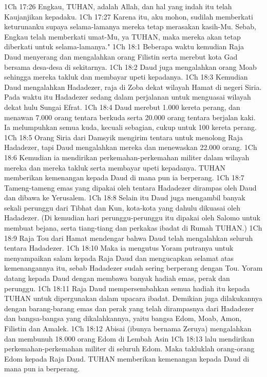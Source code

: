 1Ch 17:26  Engkau, TUHAN, adalah Allah, dan hal yang indah itu telah Kaujanjikan kepadaku.
1Ch 17:27  Karena itu, aku mohon, sudilah memberkati keturunanku supaya selama-lamanya mereka tetap merasakan kasih-Mu. Sebab, Engkau telah memberkati umat-Mu, ya TUHAN, maka mereka akan tetap diberkati untuk selama-lamanya."
1Ch 18:1  Beberapa waktu kemudian Raja Daud menyerang dan mengalahkan orang Filistin serta merebut kota Gad bersama desa-desa di sekitarnya.
1Ch 18:2  Daud juga mengalahkan orang Moab sehingga mereka takluk dan membayar upeti kepadanya.
1Ch 18:3  Kemudian Daud mengalahkan Hadadezer, raja di Zoba dekat wilayah Hamat di negeri Siria. Pada waktu itu Hadadezer sedang dalam perjalanan untuk menguasai wilayah dekat hulu Sungai Efrat.
1Ch 18:4  Daud merebut 1.000 kereta perang, dan menawan 7.000 orang tentara berkuda serta 20.000 orang tentara berjalan kaki. Ia melumpuhkan semua kuda, kecuali sebagian, cukup untuk 100 kereta perang.
1Ch 18:5  Orang Siria dari Damsyik mengirim tentara untuk menolong Raja Hadadezer, tapi Daud mengalahkan mereka dan menewaskan 22.000 orang.
1Ch 18:6  Kemudian ia mendirikan perkemahan-perkemahan militer dalam wilayah mereka dan mereka takluk serta membayar upeti kepadanya. TUHAN memberikan kemenangan kepada Daud di mana pun ia berperang.
1Ch 18:7  Tameng-tameng emas yang dipakai oleh tentara Hadadezer dirampas oleh Daud dan dibawa ke Yerusalem.
1Ch 18:8  Selain itu Daud juga mengambil banyak sekali perunggu dari Tibhat dan Kun, kota-kota yang dahulu dikuasai oleh Hadadezer. (Di kemudian hari perunggu-perunggu itu dipakai oleh Salomo untuk membuat bejana, serta tiang-tiang dan perkakas ibadat di Rumah TUHAN.)
1Ch 18:9  Raja Tou dari Hamat mendengar bahwa Daud telah mengalahkan seluruh tentara Hadadezer.
1Ch 18:10  Maka ia mengutus Yoram putranya untuk menyampaikan salam kepada Raja Daud dan mengucapkan selamat atas kemenangannya itu, sebab Hadadezer sudah sering berperang dengan Tou. Yoram datang kepada Daud dengan membawa banyak hadiah emas, perak dan perunggu.
1Ch 18:11  Raja Daud mempersembahkan semua hadiah itu kepada TUHAN untuk dipergunakan dalam upacara ibadat. Demikian juga dilakukannya dengan barang-barang emas dan perak yang telah dirampasnya dari Hadadezer dan bangsa-bangsa yang dikalahkannya, yaitu bangsa Edom, Moab, Amon, Filistin dan Amalek.
1Ch 18:12  Abisai (ibunya bernama Zeruya) mengalahkan dan membunuh 18.000 orang Edom di Lembah Asin
1Ch 18:13  lalu mendirikan perkemahan-perkemahan militer di seluruh Edom. Maka takluklah orang-orang Edom kepada Raja Daud. TUHAN memberikan kemenangan kepada Daud di mana pun ia berperang.
